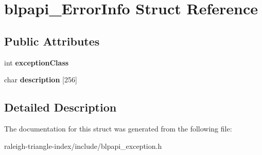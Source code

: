 \section{blpapi\+\_\+\+Error\+Info Struct Reference}
\label{structblpapi___error_info}
\subsection*{Public Attributes}
\begin{DoxyCompactItemize}
\item 
int {\bfseries exception\+Class}\label{structblpapi___error_info_ab44f4d27997b5e2060b1d602bd0fb361}

\item 
char {\bfseries description} [256]\label{structblpapi___error_info_a9cf1fd7fc1ddb661039a94625080dc5f}

\end{DoxyCompactItemize}


\subsection{Detailed Description}


The documentation for this struct was generated from the following file\+:\begin{DoxyCompactItemize}
\item 
raleigh-\/triangle-\/index/include/blpapi\+\_\+exception.\+h\end{DoxyCompactItemize}
